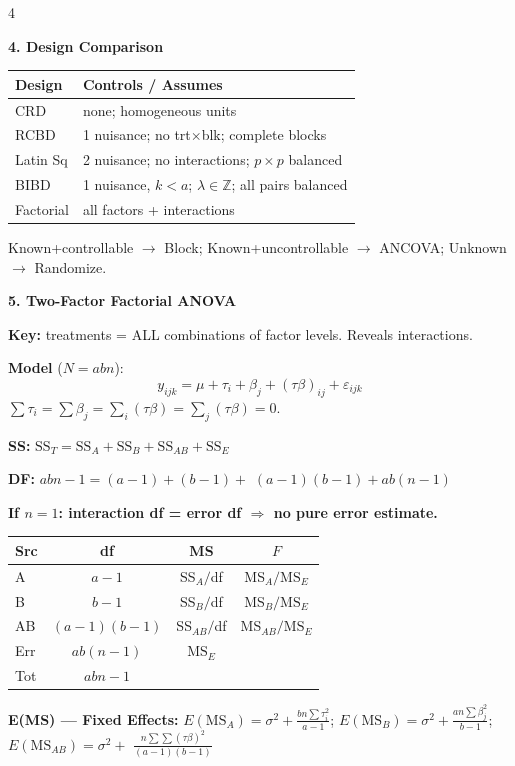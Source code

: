 \documentclass[7pt,letterpaper,landscape]{extarticle}
\newcommand{\secbar}[1]{%
  \vspace{2pt}%
  {\colorbox{black!80}{\parbox{\dimexpr\linewidth-2\fboxsep}{\color{white}\small\bfseries #1}}}\par%
  \vspace{1pt}%
}
\newcommand{\MSE}{\mathrm{MS}_E}
\newcommand{\SSE}{\mathrm{SS}_E}
\newcommand{\SST}{\mathrm{SS}_T}
\newcommand{\SSA}{\mathrm{SS}_A}
\newcommand{\SSAB}{\mathrm{SS}_{AB}}
\begin{document}
\begin{multicols*}{4}
\secbar{4. Design Comparison}
{\scriptsize
\begin{tabularx}{\linewidth}{@{}lX@{}}
\toprule
Design & Controls / Assumes\\
\midrule
CRD & none; homogeneous units\\
RCBD & 1 nuisance; no trt$\times$blk; complete blocks\\
Latin Sq & 2 nuisance; no interactions; $p\times p$ balanced\\
BIBD & 1 nuisance, $k{<}a$; $\lambda\in\mathbb Z$; all pairs balanced\\
Factorial & all factors + interactions\\
\bottomrule
\end{tabularx}\par}

{\scriptsize Known+controllable $\to$ Block; Known+uncontrollable $\to$ ANCOVA; Unknown $\to$ Randomize.}

\secbar{5. Two-Factor Factorial ANOVA}
\textbf{Key:} treatments = ALL combinations of factor levels. Reveals interactions.

\textbf{Model} ($N{=}abn$):
\[y_{ijk}{=}\mu{+}\tau_i{+}\beta_j{+}(\tau\beta)_{ij}{+}\varepsilon_{ijk}\]
$\sum\tau_i{=}\sum\beta_j{=}\sum_i(\tau\beta){=}\sum_j(\tau\beta){=}0$.

\textbf{SS:} $\SST{=}\SSA{+}\mathrm{SS}_B{+}\SSAB{+}\SSE$

\textbf{DF:} $abn{-}1=(a{-}1){+}(b{-}1){+}$ $(a{-}1)(b{-}1){+}ab(n{-}1)$

\textbf{If $n{=}1$: interaction df = error df $\Rightarrow$ no pure error estimate.}

{\scriptsize
\begin{tabular}{@{}lccc@{}}
\toprule
Src & df & MS & $F$\\
\midrule
A & $a{-}1$ & SS$_A/$df & MS$_A/\MSE$\\
B & $b{-}1$ & SS$_B/$df & MS$_B/\MSE$\\
AB & $(a{-}1)(b{-}1)$ & SS$_{AB}/$df & MS$_{AB}/\MSE$\\
Err & $ab(n{-}1)$ & $\MSE$ & \\
Tot & $abn{-}1$ & & \\
\bottomrule
\end{tabular}\par}

\textbf{E(MS) — Fixed Effects:}
$E(\text{MS}_A){=}\sigma^2{+}\tfrac{bn\sum\tau_i^2}{a-1}$;
$E(\text{MS}_B){=}\sigma^2{+}\tfrac{an\sum\beta_j^2}{b-1}$;
$E(\text{MS}_{AB}){=}\sigma^2{+}$ $\tfrac{n\sum\sum(\tau\beta)^2}{(a-1)(b-1)}$


\end{multicols*}
\end{document}
